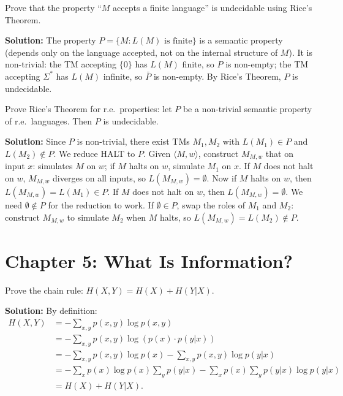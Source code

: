 \begin{exercise}[Basic]
Prove that the property ``$M$ accepts a finite language'' is undecidable using Rice's Theorem.
\end{exercise}
\textbf{Solution:} The property $P = \{M : L(M) \text{ is finite}\}$ is a semantic property (depends only on the language accepted, not on the internal structure of $M$). It is non-trivial: the TM accepting $\{0\}$ has $L(M)$ finite, so $P$ is non-empty; the TM accepting $\Sigma^*$ has $L(M)$ infinite, so $\bar{P}$ is non-empty. By Rice's Theorem, $P$ is undecidable.

\begin{exercise}[Intermediate]
Prove Rice's Theorem for r.e.\ properties: let $P$ be a non-trivial semantic property of r.e.\ languages. Then $P$ is undecidable.
\end{exercise}
\textbf{Solution:} Since $P$ is non-trivial, there exist TMs $M_1, M_2$ with $L(M_1) \in P$ and $L(M_2) \notin P$. We reduce HALT to $P$. Given $\langle M, w \rangle$, construct $M_{M,w}$ that on input $x$: simulates $M$ on $w$; if $M$ halts on $w$, simulate $M_1$ on $x$. If $M$ does not halt on $w$, $M_{M,w}$ diverges on all inputs, so $L(M_{M,w}) = \emptyset$. Now if $M$ halts on $w$, then $L(M_{M,w}) = L(M_1) \in P$. If $M$ does not halt on $w$, then $L(M_{M,w}) = \emptyset$. We need $\emptyset \notin P$ for the reduction to work. If $\emptyset \in P$, swap the roles of $M_1$ and $M_2$: construct $M_{M,w}$ to simulate $M_2$ when $M$ halts, so $L(M_{M,w}) = L(M_2) \notin P$.

\section{Chapter 5: What Is Information?}

\begin{exercise}[Basic]
Prove the chain rule: $H(X,Y) = H(X) + H(Y|X)$.
\end{exercise}
\textbf{Solution:} By definition:
\begin{align}
H(X,Y) &= -\sum_{x,y} p(x,y) \log p(x,y) \\
&= -\sum_{x,y} p(x,y) \log(p(x) \cdot p(y|x)) \\
&= -\sum_{x,y} p(x,y) \log p(x) - \sum_{x,y} p(x,y) \log p(y|x) \\
&= -\sum_x p(x) \log p(x) \sum_y p(y|x) - \sum_x p(x) \sum_y p(y|x) \log p(y|x) \\
&= H(X) + H(Y|X).
\end{align}

